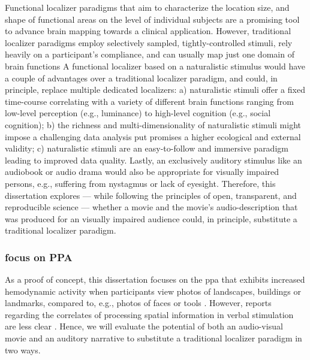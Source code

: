Functional localizer paradigms that aim to characterize the location size, and
shape of functional areas on the level of individual subjects are a promising
tool to advance brain mapping towards a clinical application.
However, traditional localizer paradigms employ selectively sampled,
tightly-controlled stimuli, rely heavily on a participant's compliance, and can
usually map just one domain of brain functions
A functional localizer based on a naturalistic stimulus would have a couple of
advantages over a traditional localizer paradigm, and could, in principle,
replace multiple dedicated localizers:
a) naturalistic stimuli offer a fixed time-course correlating with a variety of
different brain functions ranging from low-level perception (e.g., luminance) to
high-level cognition (e.g., social cognition);
b) the richness and multi-dimensionality of naturalistic stimuli might impose a
challenging data analysis put promises a higher ecological and external
validity;
c) naturalistic stimuli are an easy-to-follow and immersive paradigm leading to
improved data quality.
Lastly, an exclusively auditory stimulus like an audiobook or audio drama would
also be appropriate for visually impaired persons, e.g., suffering from
nystagmus or lack of eyesight.
Therefore, this dissertation explores --- while following the principles of
open, transparent, and reproducible science --- whether a movie and the movie's
audio-description that was produced for an visually impaired audience could, in
principle, substitute a traditional localizer paradigm.

\subsubsection{focus on PPA}
As a proof of concept, this dissertation focuses on the \ac{ppa} that exhibits
increased hemodynamic activity when participants view photos of landscapes,
buildings or landmarks, compared to, e.g., photos of faces or tools
\citep[e.g.,][for reviews]{epstein2014neural, aminoff2013role}.
However, reports regarding the correlates of processing spatial information in
verbal stimulation are less clear \citep{aziz2008modulation}.
%
Hence, we will evaluate the potential of both an audio-visual movie and an
auditory narrative to substitute a traditional localizer paradigm in two ways.

